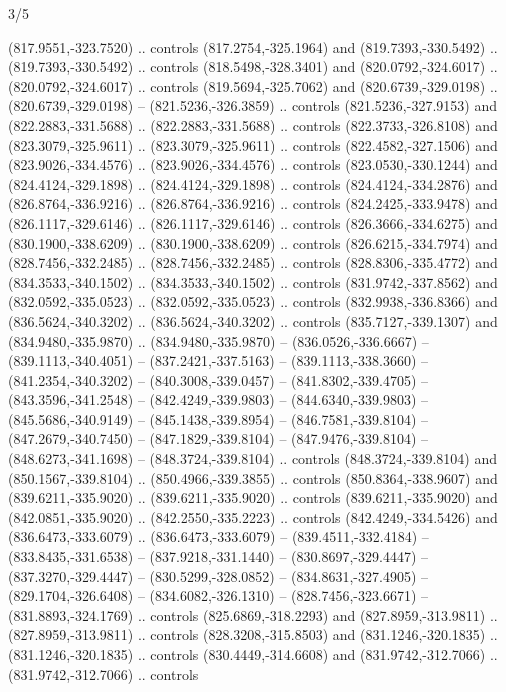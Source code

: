 \begin{flagdescription}{3/5}
\begin{scope}[xshift=0.5\flaglength,yshift=0.5\flagwidth,scale=\flagwidth/99]
\begin{scope}[y=0.8pt, x=0.8pt, yscale=-0.20628, xscale=0.20628,shift={(-500,-300)}]
\begin{scope}[cm={{0.79646,0.0,0.0,0.7753,(100.0721,273.79617)}}]
\begin{scope}[cm={{1.08438,0.0,0.0,1.08438,(-425.76596,333.57046)}}]
  (817.9551,-323.7520) .. controls (817.2754,-325.1964) and (819.7393,-330.5492)
  .. (819.7393,-330.5492) .. controls (818.5498,-328.3401) and
  (820.0792,-324.6017) .. (820.0792,-324.6017) .. controls (819.5694,-325.7062)
  and (820.6739,-329.0198) .. (820.6739,-329.0198) -- (821.5236,-326.3859) ..
  controls (821.5236,-327.9153) and (822.2883,-331.5688) .. (822.2883,-331.5688)
  .. controls (822.3733,-326.8108) and (823.3079,-325.9611) ..
  (823.3079,-325.9611) .. controls (822.4582,-327.1506) and (823.9026,-334.4576)
  .. (823.9026,-334.4576) .. controls (823.0530,-330.1244) and
  (824.4124,-329.1898) .. (824.4124,-329.1898) .. controls (824.4124,-334.2876)
  and (826.8764,-336.9216) .. (826.8764,-336.9216) .. controls
  (824.2425,-333.9478) and (826.1117,-329.6146) .. (826.1117,-329.6146) ..
  controls (826.3666,-334.6275) and (830.1900,-338.6209) .. (830.1900,-338.6209)
  .. controls (826.6215,-334.7974) and (828.7456,-332.2485) ..
  (828.7456,-332.2485) .. controls (828.8306,-335.4772) and (834.3533,-340.1502)
  .. (834.3533,-340.1502) .. controls (831.9742,-337.8562) and
  (832.0592,-335.0523) .. (832.0592,-335.0523) .. controls (832.9938,-336.8366)
  and (836.5624,-340.3202) .. (836.5624,-340.3202) .. controls
  (835.7127,-339.1307) and (834.9480,-335.9870) .. (834.9480,-335.9870) --
  (836.0526,-336.6667) -- (839.1113,-340.4051) -- (837.2421,-337.5163) --
  (839.1113,-338.3660) -- (841.2354,-340.3202) -- (840.3008,-339.0457) --
  (841.8302,-339.4705) -- (843.3596,-341.2548) -- (842.4249,-339.9803) --
  (844.6340,-339.9803) -- (845.5686,-340.9149) -- (845.1438,-339.8954) --
  (846.7581,-339.8104) -- (847.2679,-340.7450) -- (847.1829,-339.8104) --
  (847.9476,-339.8104) -- (848.6273,-341.1698) -- (848.3724,-339.8104) ..
  controls (848.3724,-339.8104) and (850.1567,-339.8104) .. (850.4966,-339.3855)
  .. controls (850.8364,-338.9607) and (839.6211,-335.9020) ..
  (839.6211,-335.9020) .. controls (839.6211,-335.9020) and (842.0851,-335.9020)
  .. (842.2550,-335.2223) .. controls (842.4249,-334.5426) and
  (836.6473,-333.6079) .. (836.6473,-333.6079) -- (839.4511,-332.4184) --
  (833.8435,-331.6538) -- (837.9218,-331.1440) -- (830.8697,-329.4447) --
  (837.3270,-329.4447) -- (830.5299,-328.0852) -- (834.8631,-327.4905) --
  (829.1704,-326.6408) -- (834.6082,-326.1310) -- (828.7456,-323.6671) --
  (831.8893,-324.1769) .. controls (825.6869,-318.2293) and (827.8959,-313.9811)
  .. (827.8959,-313.9811) .. controls (828.3208,-315.8503) and
  (831.1246,-320.1835) .. (831.1246,-320.1835) .. controls (830.4449,-314.6608)
  and (831.9742,-312.7066) .. (831.9742,-312.7066) .. controls

\end{scope}
\end{scope}
\end{scope}
\end{scope}
\end{flagdescription}

